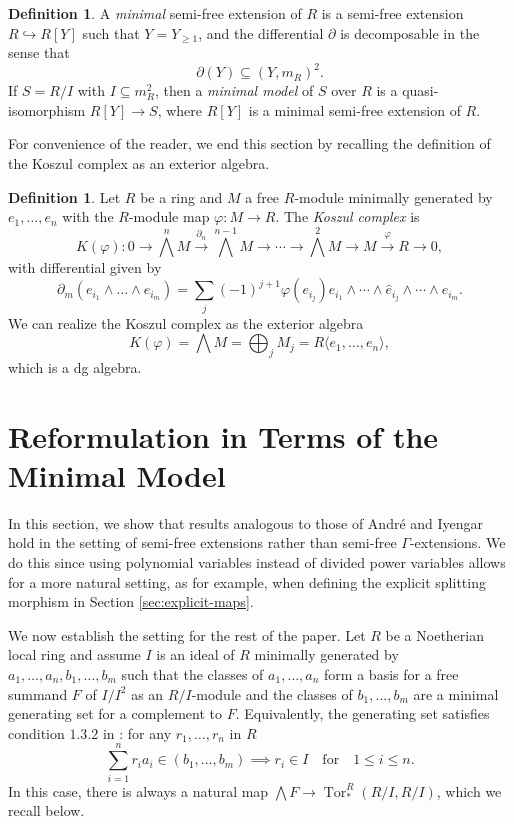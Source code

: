 \documentclass{amsart}
\theoremstyle{definition}
\newtheorem{defn}[theorem]{Definition}
\theoremstyle{remark}
\newcommand{\Tor}{\ensuremath{\operatorname{Tor}}}
\begin{document}
\begin{defn}
    A \textit{minimal} semi-free extension of $R$ is a semi-free extension $R \hookrightarrow{} R[Y]$ such that $Y=Y_{\geq1}$, and the differential $\partial$ is decomposable in the sense that \[  \partial(Y) \subseteq 
    (Y,m_R)^2.\]
If $S=R/I$ with $I \subseteq m_R^2$, then a \textit{minimal model} of $S$ over $R$ is a quasi-isomorphism $R[Y] \to S$, where $R[Y]$ is a minimal semi-free extension of $R$. 
\end{defn}

For convenience of the reader, we end this section by recalling the definition of the Koszul complex as an exterior algebra.

\begin{defn}
    Let $R$ be a ring and $M$ a free $R$-module minimally generated by $e_1, \ldots, e_n$ with the $R$-module map $\varphi: M \to R$. The \textit{Koszul complex} is 
    \[
    K(\varphi): 0 \xrightarrow{} \bigwedge ^n M \xrightarrow{\partial_n} \bigwedge^{n-1}M \xrightarrow{} \cdots \xrightarrow{} \bigwedge^2M \xrightarrow{} M \xrightarrow{\varphi} R \xrightarrow{} 0,
    \]
    with differential given by $$\partial_m(e_{i_1}\wedge \ldots \wedge e_{i_m}) = \sum_{j} (-1)^{j+1} \varphi(e_{i_j})e_{i_1}\wedge \cdots \wedge \hat{e}_{i_j}\wedge \cdots \wedge e_{i_m}.$$ We can realize the Koszul complex as the exterior algebra
    \[K(\varphi) = \bigwedge M = \bigoplus_j M_j = R\langle e_1, \ldots, e_n \rangle,\] which is a dg algebra.
\end{defn}

\section{ Reformulation in Terms of the Minimal Model}
\label{sec:minimal-model}

In this section, we show that results analogous to those of Andr\'e and Iyengar hold in the setting of semi-free extensions rather than semi-free $\Gamma$-extensions. We do this since using polynomial variables instead of divided power variables allows for a more natural setting, as for example, when defining the explicit splitting morphism in Section \ref{sec:explicit-maps}.




We now establish the setting for the rest of the paper. Let $R$ be a Noetherian local ring and assume $I$ is an ideal of $R$ minimally generated by $a_1,\ldots,a_n, b_1, \ldots, b_m$ such that the classes of $a_1,\ldots, a_n$ form a basis for a free summand $F$ of $I/I^2$ as an $R/I$-module and the classes of $b_1,\ldots, b_m$ are a minimal generating set for a complement to $F$. Equivalently, the generating set satisfies condition $1.3.2$ in \cite{Iyengar2001}:
for any $r_1,\ldots, r_n$ in $R$ 
\begin{equation}
\label{Freebasis cond}
\sum_{i=1}^n r_ia_i \in (b_1,\ldots,b_m) \implies r_i \in I \quad \text{for} \quad 1 \leq i\leq n.
\end{equation} In this case, there is always a natural map $\bigwedge F \to \Tor^R_{*}(R/I,R/I)$, which we recall below.
\end{document}

